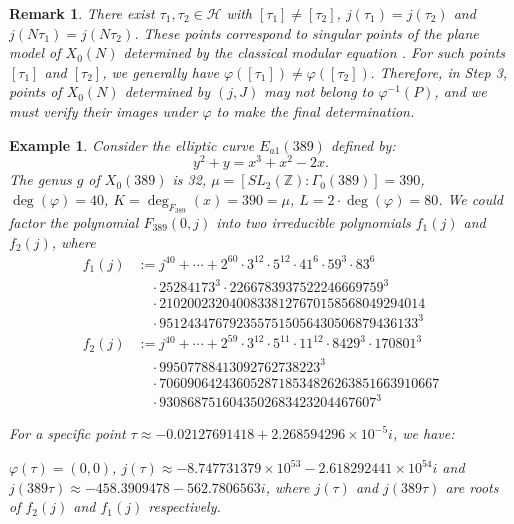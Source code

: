 \documentclass[10pt, a4paper]{article}
\newtheorem{example}[theorem]{Example}
\newtheorem{remark}[theorem]{Remark}
\begin{document}
\begin{remark}
There exist $\tau_1, \tau_2 \in \mathcal{H}$ with $[\tau_1] \neq [\tau_2]$, $j(\tau_1) = j(\tau_2)$ and $j(N\tau_1) = j(N\tau_2)$. These points correspond to singular points of the plane model of $X_0(N)$ determined by the classical modular equation \cite{Klyachko-Kara,Wang}. For such points  $[\tau_1] $ and $ [\tau_2]$, we generally have
$\varphi([\tau_1]) \neq \varphi([\tau_2]).$
Therefore, in Step 3, points of $X_0(N)$ determined by $(j,J)$ may not belong to $\varphi^{-1}(P)$, and we must verify their images under $\varphi$ to make the final determination.
\end{remark}

\begin{example}
Consider the elliptic curve $E_{a1}(389)$ defined by:
\begin{equation}
y^2 + y = x^3 + x^2 - 2x.
 \end{equation}
The genus $g$ of $X_{0}(389)$  is 32,
$\mu = [SL_2(\mathbb{Z}):\Gamma_0(389)] = 390$,
 $\deg(\varphi) = 40$,
$K = \deg_{F_{389}}(x) = 390 = \mu$, $L = 2 \cdot \deg(\varphi) = 80$.
We could factor the polynomial $F_{389}(0,j)$ into two irreducible polynomials $f_1(j)$ and $f_2(j)$, where
\begin{align*}
f_1(j) &:= j^{40} + \cdots + 2^{60} \cdot 3^{12} \cdot 5^{12} \cdot 41^6 \cdot 59^3 \cdot 83^6 \\
&\quad \cdot 25284173^3 \cdot 2266783937522246669759^3 \\
&\quad \cdot 21020023204008338127670158568049294014 \\
&\quad \cdot 9512434767923557515056430506879436133^3 \\
f_2(j) &:= j^{40} + \cdots + 2^{59} \cdot 3^{12} \cdot 5^{11} \cdot 11^{12} \cdot 8429^3 \cdot 170801^3 \\
&\quad \cdot 99507788413092762738223^3 \\
&\quad \cdot 7060906424360528718534826263851663910667 \\
&\quad \cdot 9308687516043502683423204467607^3
\end{align*}

For a specific point $\tau \approx -0.02127691418 + 2.268594296 \times 10^{-5}i$, we have:

 $\varphi(\tau) = (0,0)$,
 $j(\tau) \approx -8.747731379 \times 10^{53} - 2.618292441 \times 10^{54}i$
 and $j(389\tau) \approx -458.3909478 - 562.7806563i$,
where $j(\tau)$ and $j(389\tau)$ are roots of $f_2(j)$ and $f_1(j)$ respectively.


\end{example}
\end{document}
